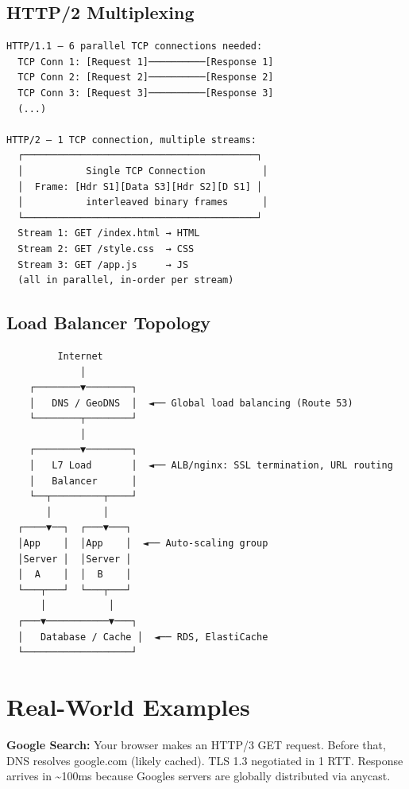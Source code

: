 \documentclass[11pt]{article}
\begin{document}
\subsection{HTTP/2 Multiplexing}\label{http2-multiplexing}

\setcodelang{}

\begin{verbatim}
HTTP/1.1 — 6 parallel TCP connections needed:
  TCP Conn 1: [Request 1]──────────[Response 1]
  TCP Conn 2: [Request 2]──────────[Response 2]
  TCP Conn 3: [Request 3]──────────[Response 3]
  (...)

HTTP/2 — 1 TCP connection, multiple streams:
  ┌─────────────────────────────────────────┐
  │           Single TCP Connection          │
  │  Frame: [Hdr S1][Data S3][Hdr S2][D S1] │
  │           interleaved binary frames      │
  └─────────────────────────────────────────┘
  Stream 1: GET /index.html → HTML
  Stream 2: GET /style.css  → CSS
  Stream 3: GET /app.js     → JS
  (all in parallel, in-order per stream)
\end{verbatim}

\subsection{Load Balancer Topology}\label{load-balancer-topology}

\setcodelang{}

\begin{verbatim}
         Internet
             │
    ┌────────▼────────┐
    │   DNS / GeoDNS  │  ◄── Global load balancing (Route 53)
    └────────┬────────┘
             │
    ┌────────▼────────┐
    │   L7 Load       │  ◄── ALB/nginx: SSL termination, URL routing
    │   Balancer      │
    └──┬─────────┬────┘
       │         │
  ┌────▼──┐  ┌───▼───┐
  │App    │  │App    │  ◄── Auto-scaling group
  │Server │  │Server │
  │  A    │  │  B    │
  └───┬───┘  └───┬───┘
      │           │
  ┌───▼───────────▼───┐
  │   Database / Cache │  ◄── RDS, ElastiCache
  └───────────────────┘
\end{verbatim}

\section{Real-World Examples}\label{real-world-examples}

\textbf{Google Search:} Your browser makes an HTTP/3 GET request. Before that, DNS resolves google.com (likely cached). TLS 1.3 negotiated in 1 RTT. Response arrives in \textasciitilde100ms because Google\textquotesingle s servers are globally distributed via anycast.
\end{document}

